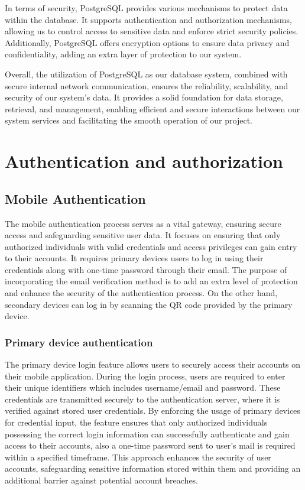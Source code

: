 \documentclass[
12pt,
oneside, 
onehalfspacing, 
nolistspacing, 
parskip, 
chapterinoneline, 
]{AASTCOMPUTER}
\begin{document}
In terms of security, PostgreSQL provides various mechanisms to protect data within the database. It supports authentication and authorization mechanisms, allowing us to control access to sensitive data and enforce strict security policies. Additionally, PostgreSQL offers encryption options to ensure data privacy and confidentiality, adding an extra layer of protection to our system.

Overall, the utilization of PostgreSQL as our database system, combined with secure internal network communication, ensures the reliability, scalability, and security of our system's data. It provides a solid foundation for data storage, retrieval, and management, enabling efficient and secure interactions between our system services and facilitating the smooth operation of our project.

\section{Authentication and authorization}

\subsection{Mobile Authentication}
The mobile authentication process serves as a vital gateway, ensuring secure access and safeguarding sensitive user data. It focuses on ensuring that only authorized individuals with valid credentials and access privileges can gain entry to their accounts. It requires primary devices users to log in using their credentials along with one-time password through their email. The purpose of incorporating the email verification method is to add an extra level of protection and enhance the security of the authentication process. On the other hand, secondary devices can log in by scanning the QR code provided by the primary device.

\subsubsection{Primary device authentication}
The primary device login feature allows users to securely access their accounts on their mobile application. During the login process, users are required to enter their unique identifiers which includes username/email and password. These credentials are transmitted securely to the authentication server, where it is verified against stored user credentials. By enforcing the usage of primary devices for credential input, the feature ensures that only authorized individuals possessing the correct login information can successfully authenticate and gain access to their accounts, also a one-time password sent to user’s mail is required within a specified timeframe. This approach enhances the security of user accounts, safeguarding sensitive information stored within them and providing an additional barrier against potential account breaches.
\end{document}

